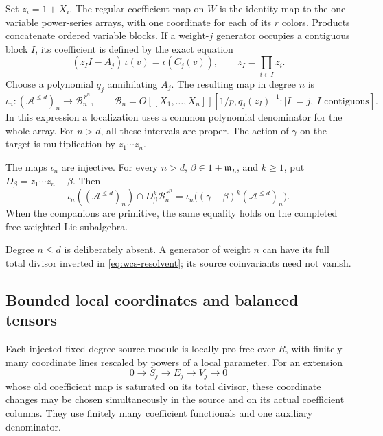 Set \(z_i=1+X_i\).  The regular coefficient map on \(W\) is the
identity map to the one-variable power-series arrays, with one
coordinate for each of its \(r\) colors.  Products concatenate
ordered variable blocks.  If a weight-\(j\) generator occupies a
contiguous block \(I\), its coefficient is defined by the exact
equation
\begin{equation}\label{eq:wcs-resolvent}
 (z_I I-A_j)\,\iota(v)=\iota(C_j(v)),
 \qquad z_I=\prod_{i\in I}z_i.
\end{equation}
Choose a polynomial \(q_j\) annihilating \(A_j\).  The resulting map in
degree \(n\) is
\[
 \iota_n:(\mathcal A^{\leq d})_n
 \longrightarrow \mathcal B_n^{\,r^n},\qquad
 \mathcal B_n=
 O[[X_1,\ldots,X_n]]
 [1/p,q_j(z_I)^{-1}:|I|=j,\ I\text{ contiguous}].
\]
In this expression a localization uses a common polynomial
denominator for the whole array.  For \(n>d\), all these intervals
are proper.  The action of \(\gamma\) on the target is multiplication
by \(z_1\cdots z_n\).

\begin{theorem}\label{thm:weighted-companion-saturation}
The maps \(\iota_n\) are injective.  For every \(n>d\),
\(\beta\in1+\mathfrak m_L\), and \(k\geq1\), put
\(D_\beta=z_1\cdots z_n-\beta\).  Then
\begin{equation}\label{eq:wcs-saturation}
 \iota_n((\mathcal A^{\leq d})_n)
       \cap D_\beta^k\mathcal B_n^{\,r^n}
 =\iota_n\bigl((\gamma-\beta)^k
                       (\mathcal A^{\leq d})_n\bigr).
\end{equation}
When the companions are primitive, the same equality holds on
the completed free weighted Lie subalgebra.
\end{theorem}

Degree \(n\leq d\) is deliberately absent.  A generator of weight
\(n\) can have its full total divisor inverted in
\eqref{eq:wcs-resolvent}; its source coinvariants need not vanish.

\subsection{Bounded local coordinates and balanced tensors}

\begin{lemma}\label{lem:wcs-local-coordinates}
Each injected fixed-degree source module is locally pro-free
over \(R\), with finitely many coordinate lines rescaled by powers
of a local parameter.  For an extension
\[
 0\longrightarrow S_j\longrightarrow E_j\longrightarrow V_j
       \longrightarrow0
\]
whose old coefficient map is saturated on its total divisor, these
coordinate changes may be chosen simultaneously in the source and
on its actual coefficient columns.  They use finitely many
coefficient functionals and one auxiliary denominator.
\end{lemma}

